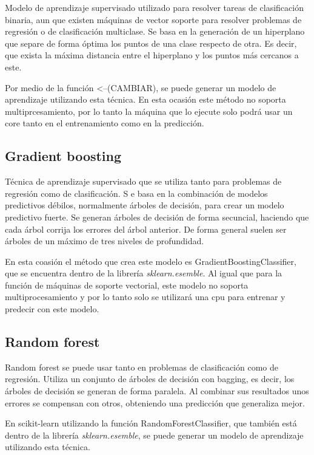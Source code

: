 \documentclass[a4paper, 12pt]{book}
\begin{document}
Modelo de aprendizaje supervisado utilizado para resolver tareas de clasificación binaria, aun que existen máquinas de vector soporte para resolver problemas de regresión o de clasificación multiclase. Se basa en la generación de un hiperplano que separe de forma óptima los puntos de una clase respecto de otra. Es decir, que exista la máxima distancia entre el hiperplano y los puntos más cercanos a este.

Por medio de la función \cite{SVMDocumentation}<--(CAMBIAR), se puede generar un modelo de aprendizaje utilizando esta técnica. En esta ocasión este método no soporta multiprcesamiento, por lo tanto la máquina que lo ejecute solo podrá usar un core tanto en el entrenamiento como en la predicción.

\subsection{Gradient boosting}

Técnica de aprendizaje supervisado que se utiliza tanto para problemas de regresión como de clasificación. S e basa en la combinación de modelos predictivos débilos, normalmente árboles de decisión, para crear un modelo predictivo fuerte. Se generan árboles de decisión de forma secuncial, haciendo que cada árbol corrija los errores del árbol anterior. De forma general suelen ser árboles de un máximo de tres niveles de profundidad.

En esta coasión el método que crea este modelo es GradientBoostingClassifier\cite{GradientTreeBDoc}, que se encuentra dentro de la librería \textit{sklearn.esemble}. Al igual que para la función de máquinas de soporte vectorial, este modelo no soporta multiprocesamiento y por lo tanto solo se utilizará una cpu para entrenar y predecir con este modelo.

\subsection{Random forest}

Random forest se puede usar tanto en problemas de clasificación como de regresión. Utiliza un conjunto de árboles de decisión con bagging, es decir, los árboles de decisión se generan de forma paralela. Al combinar sus resultados unos errores se compensan con otros, obteniendo una predicción que generaliza mejor.

En scikit-learn utilizando la función RandomForestClassifier\cite{RandomForestDoc}, que también está dentro de la librería \textit{sklearn.esemble}, se puede generar un modelo de aprendizaje utilizando esta técnica.
\end{document}
